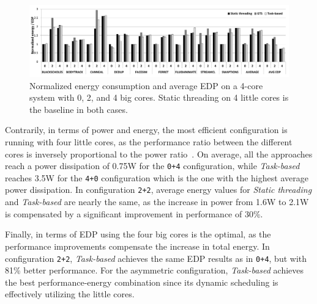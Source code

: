 \begin{figure}[!h]%
	\centering
	\includegraphics[width=1.0\textwidth]{figures/energy_EDP-4_new.pdf}
	\vspace{-0.5cm}
	\caption{Normalized energy consumption and average EDP on a 4-core system with 0, 2, and 4 big cores. Static threading on 4 little cores is the baseline in both cases. }
	\label{fig:energy4}%
\end{figure}

Contrarily, in terms of power and energy, the most efficient configuration is running with four little cores, as the performance ratio between the different cores is inversely proportional to the power ratio~\cite{Greenhalgh2011}. On average, all the approaches reach a power dissipation of 0.75W for the \texttt{0+4} configuration, while \emph{Task-based} reaches 3.5W for the \texttt{4+0} configuration which is the one with the highest average power dissipation. In configuration \texttt{2+2}, average energy values for \emph{Static threading} and \emph{Task-based} are nearly the same, as the increase in power from 1.6W to 2.1W is compensated by a significant improvement in performance of 30\%.

Finally, in terms of EDP using the four big cores is the optimal, as the performance improvements compensate the increase in total energy. 
In configuration \texttt{2+2}, \emph{Task-based} achieves the same EDP results as in \texttt{0+4}, but with 81\% better performance. 
For the asymmetric configuration, \emph{Task-based} achieves the best performance-energy combination since its dynamic scheduling is effectively utilizing the little cores. 


